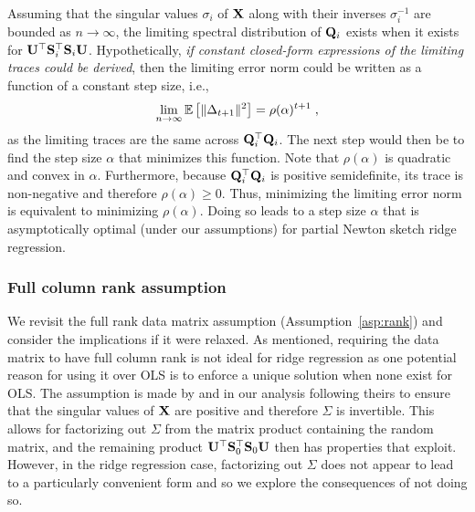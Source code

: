 Assuming that the singular values $\sigma_i$ of $\mathbf{X}$ along with their inverses $\sigma_i^{-1}$ are bounded as $n\rightarrow\infty$, the limiting spectral distribution of $\mathbf{Q}_i$ exists when it exists for $\mathbf{U}^\top\mathbf{S}_i^\top\mathbf{S}_i\mathbf{U}$. Hypothetically, \textit{if constant closed-form expressions of the limiting traces could be derived}, then the limiting error norm could be written as a function of a constant step size, i.e.,
\[
\lim_{n\rightarrow\infty}\mathbb{E}\left[\|\Delta_{t+1}\|^2\right] = \rho(\alpha)^{t+1} \;,
\]
as the limiting traces are the same across $\mathbf{Q}_i^\top\mathbf{Q}_i$. The next step would then be to find the step size $\alpha$ that minimizes this function. Note that $\rho(\alpha)$ is quadratic and convex in $\alpha$. Furthermore, because $\mathbf{Q}_i^\top\mathbf{Q}_i$ is positive semidefinite, its trace is non-negative and therefore $\rho(\alpha)\geq0$. Thus, minimizing the limiting error norm is equivalent to minimizing $\rho(\alpha)$. Doing so leads to a step size $\alpha$ that is asymptotically optimal (under our assumptions) for partial Newton sketch ridge regression.


\subsubsection{Full column rank assumption} \label{sec:fullrank}

We revisit the full rank data matrix assumption (Assumption~\ref{asp:rank}) and consider the implications if it were relaxed. As mentioned, requiring the data matrix to have full column rank is not ideal for ridge regression as one potential reason for using it over OLS is to enforce a unique solution when none exist for OLS. The assumption is made by \citet{Lacotte:2020} and in our analysis following theirs to ensure that the singular values of $\mathbf{X}$ are positive and therefore $\Sigma$ is invertible. This allows for factorizing out $\Sigma$ from the matrix product containing the random matrix, and the remaining product $\mathbf{U}^\top\mathbf{S}_0^\top\mathbf{S}_0\mathbf{U}$ then has properties that \citet{Lacotte:2020} exploit. However, in the ridge regression case, factorizing out $\Sigma$ does not appear to lead to a particularly convenient form and so we explore the consequences of not doing so.
\\


